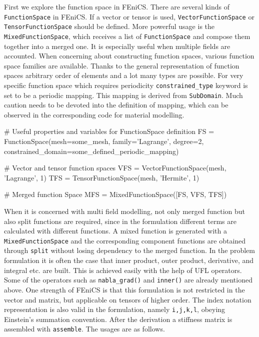First we explore the function space in FEniCS. There are several kinds of \texttt{FunctionSpace} in FEniCS. If a vector or tensor is used, \texttt{VectorFunctionSpace} or \texttt{TensorFunctionSpace} should be defined. More powerful usage is the \texttt{MixedFunctionSpace}, which receives a list of \texttt{FunctionSpace} and compose them together into a merged one. It is especially useful when multiple fields are accounted. When concerning about constructing function spaces, various function space families are available. Thanks to the general representation of function spaces arbitrary order of elements and a lot many types are possible. For very specific function space which requires periodicity \texttt{constrained\_type} keyword is set to be a periodic mapping. This mapping is derived from \texttt{SubDomain}. Much caution needs to be devoted into the definition of mapping, which can be observed in the corresponding code for material modelling.

\begin{python}
# Useful properties and variables for FunctionSpace definition
FS = FunctionSpace(mesh=some_mesh, family='Lagrange', degree=2, constrained_domain=some_defined_periodic_mapping)

# Vector and tensor function spaces
VFS = VectorFunctionSpace(mesh, 'Lagrange', 1)
TFS = TensorFunctionSpace(mesh, 'Hermite', 1)

# Merged function Space
MFS = MixedFunctionSpace([FS, VFS, TFS])
\end{python}

When it is concerned with multi field modelling, not only merged function but also split functions are required, since in the formulation different terms are calculated with different functions. A mixed function is generated with a \texttt{MixedFunctionSpace} and the corresponding component functions are obtained through \texttt{split} without losing dependency to the merged function. In the problem formulation it is often the case that inner product, outer product, derivative, and integral etc. are built. This is achieved easily with the help of UFL operators. Some of the operators such as \texttt{nabla\_grad()} and \texttt{inner()} are already mentioned above. One strength of FEniCS is that this formulation is not restricted in the vector and matrix, but applicable on tensors of higher order. The index notation representation is also valid in the formulation, namely \texttt{i,j,k,l}, obeying Einstein's summation convention. After the derivation a stiffness matrix is assembled with \texttt{assemble}. The usages are as follows.

